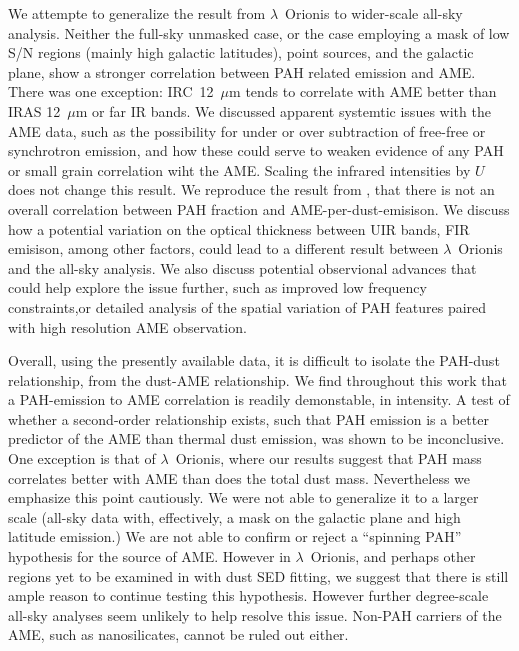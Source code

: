 \documentclass[12pt,a4paper]{article}
\begin{document}
We attempte to generalize the result from $\lambda$~Orionis to wider-scale all-sky analysis. Neither the full-sky unmasked case, or the case employing a mask of low S/N regions (mainly high galactic latitudes), point sources, and the galactic plane, show a stronger correlation between PAH related emission and AME. There was one exception: IRC~12~$\mu$m tends to correlate with AME better than IRAS 12~$\mu$m or far IR bands. We discussed apparent systemtic issues with the AME data, such as the possibility for under or over subtraction of free-free or synchrotron emission, and how these could serve to weaken evidence of any PAH or small grain correlation wiht the AME. Scaling the infrared intensities by $U$ does not change this result. We reproduce the result from \cite{hensley16}, that there is not an overall correlation between PAH fraction and AME-per-dust-emisison. We discuss how a potential variation on the optical thickness between UIR bands, FIR emisison, among other factors, could lead to a different result between $\lambda$~Orionis and the all-sky analysis. We also discuss potential observional advances that could help explore the issue further, such as improved low frequency constraints,or detailed analysis of the spatial variation of PAH features paired with high resolution AME observation.

Overall, using the presently available data, it is difficult to isolate the PAH-dust relationship, from the dust-AME relationship. We find throughout this work that a PAH-emission to AME correlation is readily demonstable, in intensity. A test of whether a second-order relationship exists, such that PAH emission is a better predictor of the AME than thermal dust emission, was shown to be inconclusive. One exception is that of $\lambda$~Orionis, where our results suggest that PAH mass correlates better with AME than does the total dust mass. Nevertheless we emphasize this point cautiously. We were not able to generalize it to a larger scale (all-sky data with, effectively, a mask on the galactic plane and high latitude emission.)  We are not able to confirm or reject a ``spinning PAH'' hypothesis for the source of AME. However in $\lambda$~Orionis, and perhaps other regions yet to be examined in with dust SED fitting, we suggest that there is still ample reason to continue testing this hypothesis. However further degree-scale all-sky analyses seem unlikely to help resolve this issue. Non-PAH carriers of the AME, such as nanosilicates, cannot be ruled out either.


\small


\end{document}
